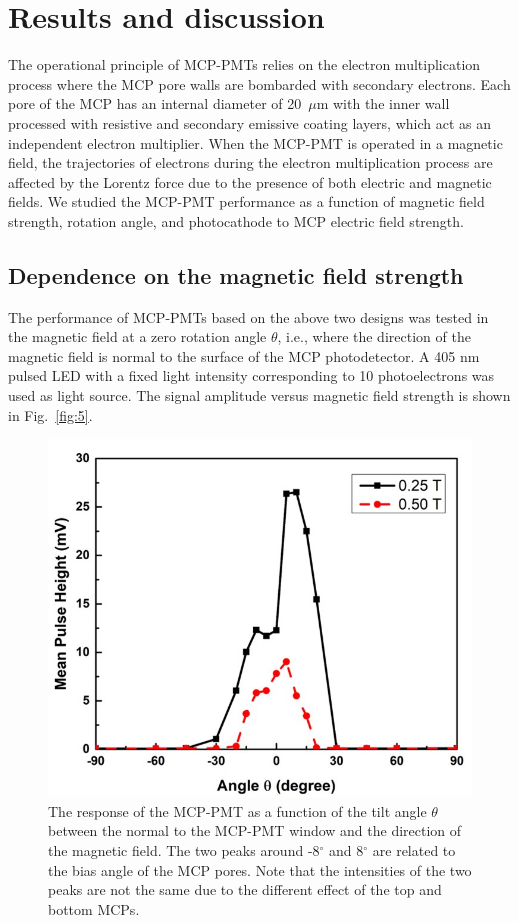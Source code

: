 \documentclass[preprint,5p]{elsarticle}
\begin{document}
\section{Results and discussion} \label{}
The operational principle of MCP-PMTs relies on the electron multiplication process 
where the MCP pore walls are bombarded with secondary electrons. Each 
pore of the MCP has an internal diameter of 
20~$\mu$m with the inner wall processed with resistive and secondary emissive 
coating layers, which act as an independent electron multiplier. When the MCP-PMT is 
operated in a magnetic field, the trajectories of electrons during the electron 
multiplication process are affected by the Lorentz force due to the 
presence of both electric and magnetic fields. We studied the MCP-PMT performance 
as a function of magnetic field strength, rotation angle, and photocathode to MCP electric 
field strength. 

\subsection{Dependence on the magnetic field strength} \label{}
The performance of MCP-PMTs based on the above two designs
was tested in the magnetic field  at a zero rotation angle $\theta$, i.e., where the direction of the 
magnetic field is normal to the surface of the MCP photodetector.
A 405 nm pulsed LED with a fixed light intensity corresponding to 10 photoelectrons
was used as light source.
The signal amplitude versus magnetic field strength is shown in Fig.~\ref{fig:5}. 

\begin{figure}[tbp]
\centering \includegraphics[scale=0.65]{fig/Figure6.jpg}
\caption{The response of the MCP-PMT as a function of the tilt angle $\theta$ 
   between the normal to the MCP-PMT window and the direction of the magnetic 
   field.  The two peaks around -8$^{\circ}$ and 8$^{\circ}$ are related to the 
   bias angle of the MCP pores. Note that the 
   intensities of the two peaks are not the same due to the different effect 
   of the top and bottom MCPs. } 
   \label{fig:6}
\end{figure}
\end{document}
